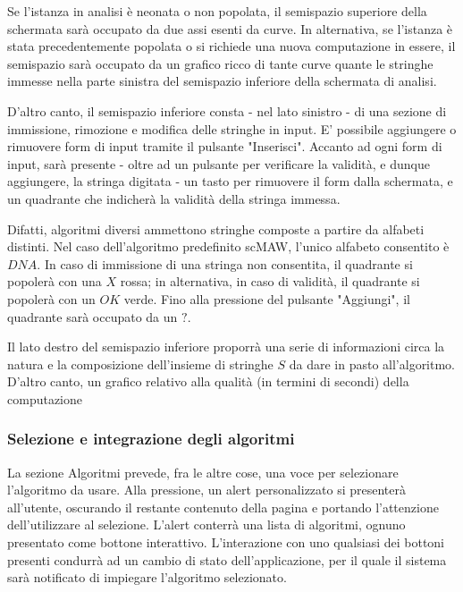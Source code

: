 \vspace{3mm}

Se l'istanza in analisi è neonata o non popolata, il semispazio superiore della schermata sarà occupato da due assi esenti da curve. In alternativa, se l'istanza è stata precedentemente popolata o si richiede una nuova computazione in essere, il semispazio sarà occupato da un grafico ricco di tante curve quante le stringhe immesse nella parte sinistra del semispazio inferiore della schermata di analisi.

\vspace{3mm}

D'altro canto, il semispazio inferiore consta - nel lato sinistro -  di una sezione di immissione, rimozione e modifica delle stringhe in input. E' possibile aggiungere o rimuovere form di input tramite il pulsante "Inserisci". Accanto ad ogni form di input, sarà presente - oltre ad un pulsante per verificare la validità, e dunque aggiungere, la stringa digitata - un tasto per rimuovere il form dalla schermata, e un quadrante che indicherà la validità della stringa immessa. 

\vspace{3mm}

Difatti, algoritmi diversi ammettono stringhe composte a partire da alfabeti distinti. Nel caso dell'algoritmo predefinito scMAW, l'unico alfabeto consentito è $DNA$. In caso di immissione di una stringa non consentita, il quadrante si popolerà con una $X$ rossa; in alternativa, in caso di validità, il quadrante si popolerà con un $OK$ verde. Fino alla pressione del pulsante "Aggiungi", il quadrante sarà occupato da un $?$.

\vspace{3mm}

Il lato destro del semispazio inferiore proporrà una serie di informazioni circa la natura e la composizione dell'insieme di stringhe $S$ da dare in pasto all'algoritmo. D'altro canto, un grafico relativo alla qualità (in termini di secondi) della computazione

\subsubsection{Selezione e integrazione degli algoritmi}

La sezione Algoritmi prevede, fra le altre cose, una voce per selezionare l'algoritmo da usare. Alla pressione, un alert personalizzato si presenterà all'utente, oscurando il restante contenuto della pagina e portando l'attenzione dell'utilizzare al selezione. L'alert conterrà una lista di algoritmi, ognuno presentato come bottone interattivo. L'interazione con uno qualsiasi dei bottoni presenti condurrà ad un cambio di stato dell'applicazione, per il quale il sistema sarà notificato di impiegare l'algoritmo selezionato.

